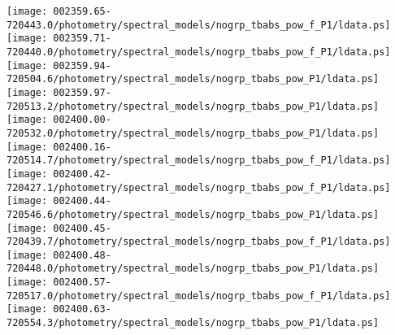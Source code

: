 \documentclass{aastex}
\begin{document}
\begin{figure*}[!ht]
\centering
\texttt{[image: 002359.65-720443.0/photometry/spectral\_models/nogrp\_tbabs\_pow\_f\_P1/ldata.ps]} \hfill 
\texttt{[image: 002359.71-720440.0/photometry/spectral\_models/nogrp\_tbabs\_pow\_f\_P1/ldata.ps]} \hfill 
\texttt{[image: 002359.94-720504.6/photometry/spectral\_models/nogrp\_tbabs\_pow\_P1/ldata.ps]} \\ 
\vspace*{0.5in}
\texttt{[image: 002359.97-720513.2/photometry/spectral\_models/nogrp\_tbabs\_pow\_P1/ldata.ps]} \hfill 
\texttt{[image: 002400.00-720532.0/photometry/spectral\_models/nogrp\_tbabs\_pow\_P1/ldata.ps]} \hfill 
\texttt{[image: 002400.16-720514.7/photometry/spectral\_models/nogrp\_tbabs\_pow\_f\_P1/ldata.ps]} \\ 
\vspace*{0.5in}
\texttt{[image: 002400.42-720427.1/photometry/spectral\_models/nogrp\_tbabs\_pow\_f\_P1/ldata.ps]} \hfill 
\texttt{[image: 002400.44-720546.6/photometry/spectral\_models/nogrp\_tbabs\_pow\_P1/ldata.ps]} \hfill 
\texttt{[image: 002400.45-720439.7/photometry/spectral\_models/nogrp\_tbabs\_pow\_f\_P1/ldata.ps]} \\ 
\vspace*{0.5in}
\texttt{[image: 002400.48-720448.0/photometry/spectral\_models/nogrp\_tbabs\_pow\_P1/ldata.ps]} \hfill 
\texttt{[image: 002400.57-720517.0/photometry/spectral\_models/nogrp\_tbabs\_pow\_f\_P1/ldata.ps]} \hfill 
\texttt{[image: 002400.63-720554.3/photometry/spectral\_models/nogrp\_tbabs\_pow\_P1/ldata.ps]} \\ 
\vspace*{0.5in}
\end{figure*}
\clearpage
\end{document}
